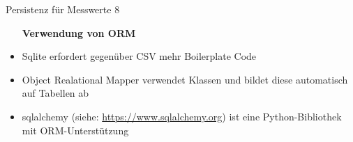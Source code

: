 \begin{frame}[fragile]{Persistenz für Messwerte 8}
       \begin{itemize}
        \setlength{\itemindent}{1.9in}
        \item [\textbf{Verwendung von ORM }]
    \end{itemize}

    \begin{itemize}
        \item Sqlite erfordert gegenüber CSV mehr Boilerplate Code
        \item Object Realational Mapper verwendet Klassen und bildet diese automatisch auf Tabellen ab
        \item sqlalchemy (siehe: \url{https://www.sqlalchemy.org}) ist eine Python-Bibliothek mit ORM-Unterstützung  
     \end{itemize}

\end{frame}
